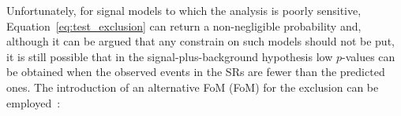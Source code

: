 

			Unfortunately, for signal models to which the analysis is poorly sensitive, Equation~\ref{eq:test_exclusion} can return a non-negligible probability and, although it can be argued that any constrain on such models should not be put, it is still possible that in the signal-plus-background hypothesis low $p$-values can be obtained when the observed events in the \acp{SR} are fewer than the predicted ones. The introduction of an alternative \acl{FoM} (FoM) for the exclusion can be employed~\cite{Read:2002hq}:

